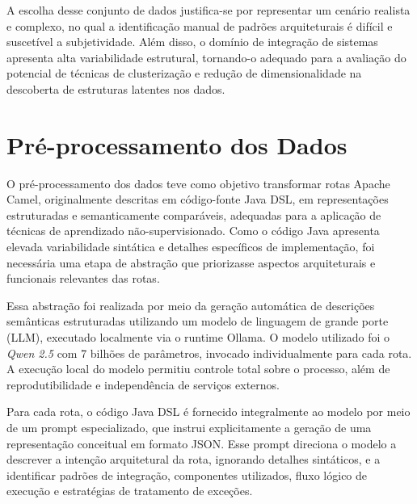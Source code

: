 \documentclass[12pt,a4paper]{article}
\begin{document}
A escolha desse conjunto de dados justifica-se por representar um cenário realista e complexo, no qual a identificação manual de padrões arquiteturais é difícil e suscetível a subjetividade. Além disso, o domínio de integração de sistemas apresenta alta variabilidade estrutural, tornando-o adequado para a avaliação do potencial de técnicas de clusterização e redução de dimensionalidade na descoberta de estruturas latentes nos dados.

\section{Pré-processamento dos Dados}

O pré-processamento dos dados teve como objetivo transformar rotas Apache Camel, originalmente descritas em código-fonte Java DSL, em representações estruturadas e semanticamente comparáveis, adequadas para a aplicação de técnicas de aprendizado não-supervisionado. Como o código Java apresenta elevada variabilidade sintática e detalhes específicos de implementação, foi necessária uma etapa de abstração que priorizasse aspectos arquiteturais e funcionais relevantes das rotas.

Essa abstração foi realizada por meio da geração automática de descrições semânticas estruturadas utilizando um modelo de linguagem de grande porte (LLM), executado localmente via o runtime Ollama. O modelo utilizado foi o \textit{Qwen 2.5} com 7 bilhões de parâmetros, invocado individualmente para cada rota. A execução local do modelo permitiu controle total sobre o processo, além de reprodutibilidade e independência de serviços externos.

Para cada rota, o código Java DSL é fornecido integralmente ao modelo por meio de um prompt especializado, que instrui explicitamente a geração de uma representação conceitual em formato JSON. Esse prompt direciona o modelo a descrever a intenção arquitetural da rota, ignorando detalhes sintáticos, e a identificar padrões de integração, componentes utilizados, fluxo lógico de execução e estratégias de tratamento de exceções.


\end{document}

